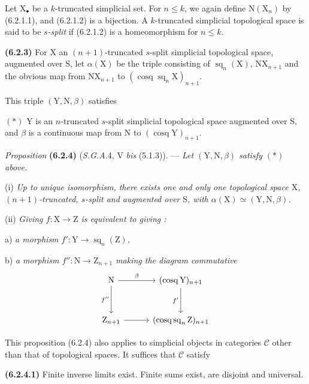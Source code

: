 \documentclass[11pt,leqno]{article}
\newcommand{\Page}[1]{\ifvmode\noindent\else\unskip\ \fi{\footnotesize\textcolor{gray}{[p.\,#1]}}\ \ignorespaces}
\begin{document}
Let \(\mathrm{X}_{\bullet}\) be a \(k\)-truncated simplicial set. For \(n\leq k\), we again define \(\mathrm{N}(\mathrm{X}_n)\) by (6.2.1.1), and (6.2.1.2) is a bijection. A \(k\)-truncated simplicial topological space is said to be \textit{\(s\)-split} if (6.2.1.2) is a homeomorphism for \(n\leq k\).

\textbf{(6.2.3)} For \(\mathrm{X}\) an \((n+1)\)-truncated \(s\)-split simplicial topological space, augmented over \(\mathrm{S}\), let \(\alpha(\mathrm{X})\) be the triple consisting of \(\operatorname{sq}_n(\mathrm{X})\), \(\mathrm{N}\mathrm{X}_{n+1}\) and the obvious map from \(\mathrm{N}\mathrm{X}_{n+1}\) to \((\operatorname{cosq}\operatorname{sq}_n\mathrm{X})_{n+1}\).

This triple \((\mathrm{Y},\mathrm{N},\beta)\) satisfies

\((\ast)\) \(\mathrm{Y}\) is an \(n\)-truncated \(s\)-split simplicial topological space augmented over \(\mathrm{S}\), and \(\beta\) is a continuous map from \(\mathrm{N}\) to \((\operatorname{cosq}\mathrm{Y})_{n+1}\).

\textit{Proposition} \textbf{(6.2.4)} (\textit{S.G.A.}4, V \textit{bis} (5.1.3)). — \textit{Let \((\mathrm{Y},\mathrm{N},\beta)\) satisfy \((\ast)\) above.}

(i) \textit{Up to unique isomorphism, there exists one and only one topological space \(\mathrm{X}\), \((n+1)\)-truncated, \(s\)-split and augmented over \(\mathrm{S}\), with \(\alpha(\mathrm{X})\simeq(\mathrm{Y},\mathrm{N},\beta)\).}

(ii) \textit{Giving \(f:\mathrm{X}\to\mathrm{Z}\) is equivalent to giving :}

a) \textit{a morphism \(f':\mathrm{Y}\to\operatorname{sq}_n(\mathrm{Z})\),}

b) \textit{a morphism \(f'':\mathrm{N}\to\mathrm{Z}_{n+1}\) making the diagram commutative}
\[
\begin{tikzcd}[column sep=3em,row sep=3em]
\mathrm{N}\arrow[r,"\beta"]\arrow[d,"f''"']
  & (\operatorname{cosq}\mathrm{Y})_{n+1}\arrow[d,"f'"']\\
\mathrm{Z}_{n+1}\arrow[r]
  & (\operatorname{cosq}\operatorname{sq}_n\mathrm{Z})_{n+1}
\end{tikzcd}
\]

This proposition (6.2.4) also applies to simplicial objects in categories \(\mathcal{C}\) other than that of topological spaces. It suffices that \(\mathcal{C}\) satisfy
\Page{20}

\textbf{(6.2.4.1)} Finite inverse limits exist. Finite sums exist, are disjoint and universal.
\end{document}
